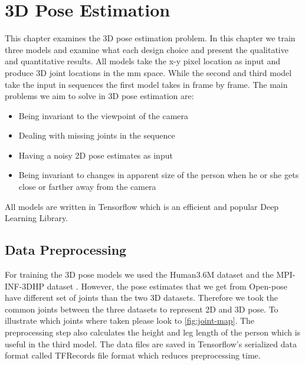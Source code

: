 
\chapter{3D Pose Estimation}\label{chapter:3Dpose}

This chapter examines the 3D pose estimation problem. In this chapter we train three models and examine what each design choice and present the qualitative and quantitative results. All models take the x-y pixel location as input and produce 3D joint locations in the mm space. While the second and third model take the input in sequences the first model takes in frame by frame. The main problems we aim to solve in 3D pose estimation are:
\begin{itemize}
    \item Being invariant to the viewpoint of the camera
    \item Dealing with missing joints in the sequence
    \item Having a noisy 2D pose estimates as input
    \item Being invariant to changes in apparent size of the person when he or she gets close or farther away from the camera
\end{itemize}

All models are written in Tensorflow \parencite{abadi2016tensorflow} which is an efficient and popular Deep Learning Library.

\section{Data Preprocessing}

For training the 3D pose models we used the Human3.6M dataset \parencite{ionescu2014human3} and the MPI-INF-3DHP dataset \parencite{mehta2017monocular}. However, the pose estimates that we get from Open-pose \parencite{cao2016realtime} have different set of joints than the two 3D datasets. Therefore we took the common joints between the three datasets to represent 2D and 3D pose. To illustrate which joints where taken please look to \autoref{fig:joint-map}. The preprocessing step also calculates the height and leg length of the person which is useful in the third model. The data files are saved in Tensorflow's \parencite{abadi2016tensorflow} serialized data format called TFRecords file format which reduces preprocessing time.

